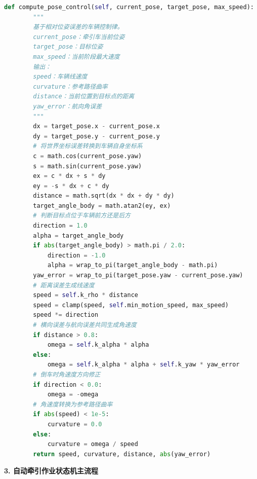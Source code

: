 \documentclass[UTF8,a4paper,12pt]{ctexart}
\begin{document}
\begin{lstlisting}[language=Python]
  def compute_pose_control(self, current_pose, target_pose, max_speed):
        """
        基于相对位姿误差的车辆控制律。
        current_pose：牵引车当前位姿
        target_pose：目标位姿
        max_speed：当前阶段最大速度
        输出：
        speed：车辆线速度
        curvature：参考路径曲率
        distance：当前位置到目标点的距离
        yaw_error：航向角误差
        """
        dx = target_pose.x - current_pose.x
        dy = target_pose.y - current_pose.y
        # 将世界坐标误差转换到车辆自身坐标系
        c = math.cos(current_pose.yaw)
        s = math.sin(current_pose.yaw)
        ex = c * dx + s * dy
        ey = -s * dx + c * dy
        distance = math.sqrt(dx * dx + dy * dy)
        target_angle_body = math.atan2(ey, ex)
        # 判断目标点位于车辆前方还是后方
        direction = 1.0
        alpha = target_angle_body
        if abs(target_angle_body) > math.pi / 2.0:
            direction = -1.0
            alpha = wrap_to_pi(target_angle_body - math.pi)
        yaw_error = wrap_to_pi(target_pose.yaw - current_pose.yaw)
        # 距离误差生成线速度
        speed = self.k_rho * distance
        speed = clamp(speed, self.min_motion_speed, max_speed)
        speed *= direction
        # 横向误差与航向误差共同生成角速度
        if distance > 0.8:
            omega = self.k_alpha * alpha
        else:
            omega = self.k_alpha * alpha + self.k_yaw * yaw_error
        # 倒车时角速度方向修正
        if direction < 0.0:
            omega = -omega
        # 角速度转换为参考路径曲率
        if abs(speed) < 1e-5:
            curvature = 0.0
        else:
            curvature = omega / speed
        return speed, curvature, distance, abs(yaw_error)
\end{lstlisting}
\noindent\textbf{3. 自动牵引作业状态机主流程}
\end{document}
